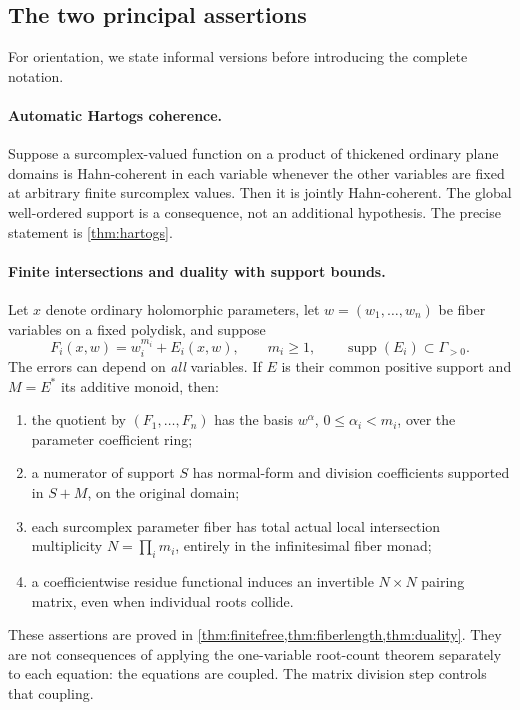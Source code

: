 \documentclass[11pt,oneside]{article}
\numberwithin{equation}{section}
\theoremstyle{definition}
\theoremstyle{remark}\newtheorem{remark}[theorem]{Remark}
\newcommand{\supp}{\operatorname{supp}}
\begin{document}
\subsection{The two principal assertions}
For orientation, we state informal versions before introducing the complete notation.

\paragraph{Automatic Hartogs coherence.}
Suppose a surcomplex-valued function on a product of thickened ordinary plane domains is Hahn-coherent in each variable whenever the other variables are fixed at arbitrary finite surcomplex values. Then it is jointly Hahn-coherent. The global well-ordered support is a consequence, not an additional hypothesis. The precise statement is \cref{thm:hartogs}.

\paragraph{Finite intersections and duality with support bounds.}
Let \(x\) denote ordinary holomorphic parameters, let \(w=(w_1,\ldots,w_n)\) be fiber variables on a fixed polydisk, and suppose
\begin{equation}\label{eq:intromodel}
 F_i(x,w)=w_i^{m_i}+E_i(x,w),\qquad m_i\geq1,
 \qquad \supp(E_i)\subset\Gamma_{>0}.
\end{equation}
The errors can depend on \emph{all} variables. If \(E\) is their common positive support and \(M=E^*\) its additive monoid, then:
\begin{enumerate}
\item the quotient by \((F_1,\ldots,F_n)\) has the basis
\(w^\alpha\), \(0\leq\alpha_i<m_i\), over the parameter coefficient ring;
\item a numerator of support \(S\) has normal-form and division coefficients supported in \(S+M\), on the original domain;
\item each surcomplex parameter fiber has total actual local intersection multiplicity \(N=\prod_i m_i\), entirely in the infinitesimal fiber monad;
\item a coefficientwise residue functional induces an invertible \(N\times N\) pairing matrix, even when individual roots collide.
\end{enumerate}
These assertions are proved in \cref{thm:finitefree,thm:fiberlength,thm:duality}. They are not consequences of applying the one-variable root-count theorem separately to each equation: the equations are coupled. The matrix division step controls that coupling.
\end{document}
